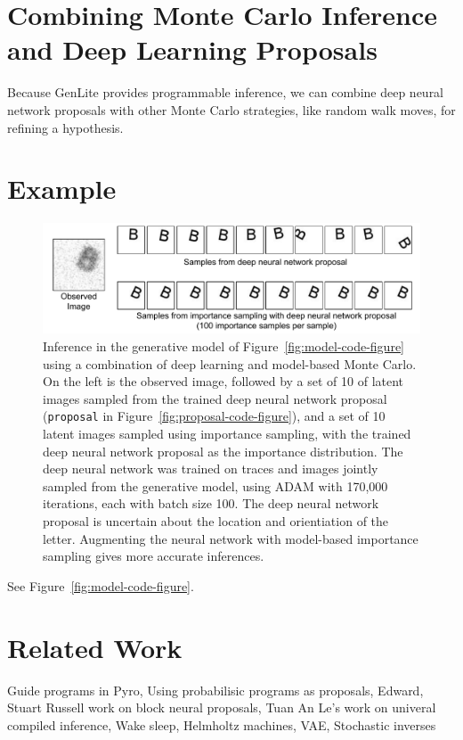 \documentclass{article}
\begin{document}
\section{Combining Monte Carlo Inference and Deep Learning Proposals}
Because GenLite provides programmable inference, we can combine deep neural network proposals with other Monte Carlo strategies, like random walk moves, for refining a hypothesis.





\section{Example}

\begin{figure}[h]
\centering
    \includegraphics[width=1.0\textwidth]{images/deep-neural-network-is.pdf}
    \caption{
Inference in the generative model of Figure~\ref{fig:model-code-figure} using a combination of deep learning and model-based Monte Carlo.
On the left is the observed image, followed by a set of 10 of latent images sampled from the trained deep neural network proposal (\texttt{proposal} in Figure~\ref{fig:proposal-code-figure}), and a set of 10 latent images sampled using importance sampling, with the trained deep neural network proposal as the importance distribution.
The deep neural network was trained on traces and images jointly sampled from the generative model, using ADAM with 170,000 iterations, each with batch size 100.
The deep neural network proposal is uncertain about the location and orientiation of the letter.
Augmenting the neural network with model-based importance sampling gives more accurate inferences.
}
    \label{fig:example-results}
\end{figure}

See Figure~\ref{fig:model-code-figure}.


\section{Related Work}
Guide programs in Pyro,
Using probabilisic programs as proposals,
Edward,
Stuart Russell work on block neural proposals,
Tuan An Le's work on univeral compiled inference,
Wake sleep,
Helmholtz machines,
VAE,
Stochastic inverses
\end{document}

